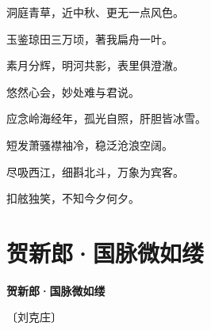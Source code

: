 \documentclass[12pt,UTF-8,openany,fontset=none]{ctexbook}
\begin{document}
    \vspace{18pt}  %

\begin{center}
    \begin{Large}

        洞庭青草，近中秋、更无一点风色。

        玉鉴琼田三万顷，著我扁舟一叶。

        素月分辉，明河共影，表里俱澄澈。

        悠然心会，妙处难与君说。

        \vspace{18pt}  %

        应念岭海经年，孤光自照，肝胆皆冰雪。

        短发萧骚襟袖冷，稳泛沧浪空阔。

        尽吸西江，细斟北斗，万象为宾客。

        扣舷独笑，不知今夕何夕。

    \end{Large}

\end{center}

\vspace{8pt}
\clearpage

\section{贺新郎·国脉微如缕}


\begin{center}
    {\bfseries 贺新郎·国脉微如缕}

    \vspace{18pt}

    \begin{large}\xuwen
        〔刘克庄〕
    \end{large}

\end{center}

    \vspace{18pt}  %
\end{document}
